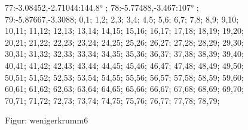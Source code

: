 \documentclass[a4paper,10pt,ngerman]{scrartcl}
\begin{document}
\begin{figure}[!h]
{    77:-3.08452,-2.71044:144.8° ;
    78:-5.77488,-3.467:107° ;
    79:-5.87667,-3.3088;
}{
0,1;
1,2;
2,3;
3,4;
4,5;
5,6;
6,7;
7,8;
8,9;
9,10;
10,11;
11,12;
12,13;
13,14;
14,15;
15,16;
16,17;
17,18;
18,19;
19,20;
20,21;
21,22;
22,23;
23,24;
24,25;
25,26;
26,27;
27,28;
28,29;
29,30;
30,31;
31,32;
32,33;
33,34;
34,35;
35,36;
36,37;
37,38;
38,39;
39,40;
40,41;
41,42;
42,43;
43,44;
44,45;
45,46;
46,47;
47,48;
48,49;
49,50;
50,51;
51,52;
52,53;
53,54;
54,55;
55,56;
56,57;
57,58;
58,59;
59,60;
60,61;
61,62;
62,63;
63,64;
64,65;
65,66;
66,67;
67,68;
68,69;
69,70;
70,71;
71,72;
72,73;
73,74;
74,75;
75,76;
76,77;
77,78;
78,79;
}
\caption{Figur: wenigerkrumm6}
\label{fig:wenigerkrumm6}
\end{figure}
\newpage

	
\end{document}

